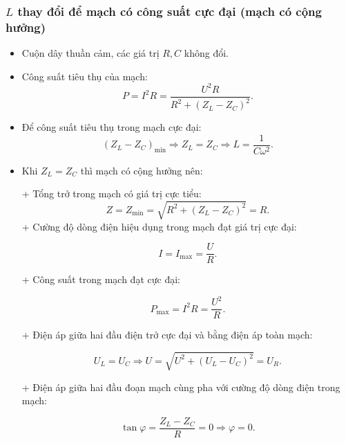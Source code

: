 \subsubsection {$L$ thay đổi để mạch có công suất cực đại (mạch có cộng hưởng)}
\begin{itemize}
	\item Cuộn dây thuần cảm, các giá trị $R, C$ không đổi.
	\item  Công suất tiêu thụ của mạch:
	\begin{equation*}
		P=I^2R=\dfrac{U^2R}{R^2+(Z_L-Z_C)^2}.
	\end{equation*}
	\item Để công suất tiêu thụ trong mạch cực đại:
	\begin{equation*}
		(Z_L-Z_C)_{\text{min}} \Rightarrow Z_L =Z_C \Rightarrow L =\dfrac{1}{C\omega^2}.
	\end{equation*}
	\item Khi $Z_L = Z_C$ thì mạch có cộng hưởng nên:
	
	+ Tổng trở trong mạch có giá trị cực tiểu:
	\begin{equation*}
		Z=Z_{\text{min}}=\sqrt {R^2 + (Z_L-Z_C)^2} =R.
	\end{equation*}
	+ Cường độ dòng điện hiệu dụng trong mạch đạt giá trị cực đại:
	
	\begin{equation*}
		I=I_{\text{max}} =\dfrac{U}{R}.
	\end{equation*}
	
	+ Công suất trong mạch đạt cực đại:
	
	\begin{equation*}
		P_{\text{max}} = I^2R =\dfrac{U^2}{R}.
	\end{equation*}
	
	+ Điện áp giữa hai đầu điện trở cực đại và bằng điện áp toàn mạch:
	
	\begin{equation*}
		U_L=U_C \Rightarrow U =\sqrt {U^2 + (U_L-U_C)^2}= U_R.
	\end{equation*}
	
	+ Điện áp giữa hai đầu đoạn mạch cùng pha với cường độ dòng điện trong mạch:
	
	\begin{equation*}
		\tan \varphi = \dfrac{Z_L-Z_C}{R}=0 \Rightarrow \varphi =0.
	\end{equation*}
\end{itemize} 

